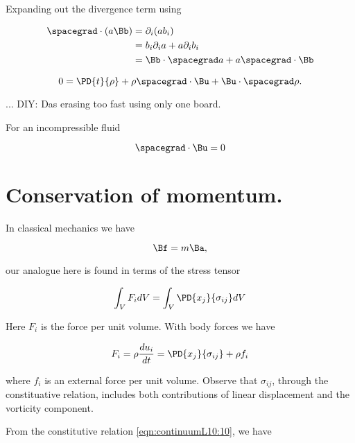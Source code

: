 Expanding out the divergence term using

\begin{align*}
\spacegrad \cdot (a \Bb)
&=
\partial_i (a b_i) \\
&=
b_i \partial_i a 
+
a \partial_i b_i \\
&=
\Bb \cdot \spacegrad a
+ a \spacegrad \cdot \Bb
\end{align*}

\begin{equation}\label{eqn:continuumL10:90}
0 = \PD{t}{\rho} 
+ \rho \spacegrad \cdot \Bu
+ \Bu \cdot \spacegrad \rho.
\end{equation}

... DIY: Das erasing too fast using only one board.

For an incompressible fluid 

\begin{equation}\label{eqn:continuumL10:110}
\spacegrad \cdot \Bu = 0
\end{equation}

\section{Conservation of momentum.}

In classical mechanics we have

\begin{equation}\label{eqn:continuumL10:130}
\Bf = m \Ba,
\end{equation}

our analogue here is found in terms of the stress tensor

\begin{equation}\label{eqn:continuumL10:150}
\int_V F_i dV = \int_V \PD{x_j}{\sigma_{ij}} dV
\end{equation}

Here $F_i$ is the force per unit volume.  With body forces we have

\begin{equation}\label{eqn:continuumL10:170}
F_i = \rho \frac{du_i}{dt} = \PD{x_j}{\sigma_{ij}} + \rho f_i
\end{equation}

where $f_i$ is an external force per unit volume.  Observe that $\sigma_{ij}$, through the constituative relation, includes both contributions of linear displacement and the vorticity component.  

From the constitutive relation \ref{eqn:continuumL10:10}, we have

